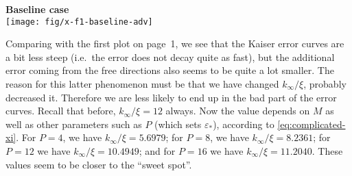 \documentclass[a4paper,10pt]{article}
\begin{document}
\begin{center}
  \textbf{Baseline case}\\
  \texttt{[image: fig/x-f1-baseline-adv]}
\end{center}
Comparing with the first plot on page~1, we see that the Kaiser
error curves are a bit less steep (i.e.\ the error does not decay
quite as fast), but the additional error coming from the free
directions also seems to be quite a lot smaller. The reason for
this latter phenomenon must be that we have changed
$k_\infty/\xi$, probably decreased it. Therefore we are less
likely to end up in the bad part of the error curves. Recall
that before, $k_\infty/\xi=12$ always. Now the value depends on $M$ as
well as other parameters such as $P$ (which sets
$\varepsilon_*$), according to \eqref{eq:complicated-xi}.
For $P=4$, we have $k_\infty/\xi=5.6979$; for $P=8$, we have
$k_\infty/\xi=8.2361$; for $P=12$ we have $k_\infty/\xi=10.4949$;
and for $P=16$ we have $k_\infty/\xi=11.2040$. These values seem
to be closer to the ``sweet spot''.
\end{document}
